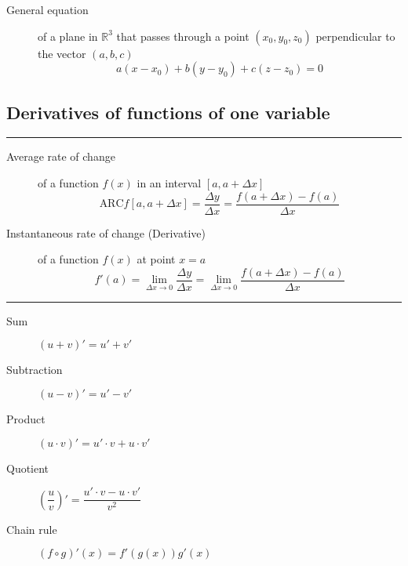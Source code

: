\begin{multicols}{2}
	\begin{tcolorbox}[hbox, title=Planes]
		\begin{minipage}{0.4\textwidth}
			\begin{description}
				\item[General equation] of a plane in $\mathbb{R}^3$ that passes through a point $(x_0,y_0,z_0)$ perpendicular to the vector $(a,b,c)$
				      \[
					      a(x-x_0)+b(y-y_0)+c(z-z_0)=0
				      \]
			\end{description}
		\end{minipage}
	\end{tcolorbox}


\subsection*{Derivatives of functions of one variable}

	\begin{tcolorbox}[hbox, title=Concept of derivative]
		\begin{minipage}{0.4\textwidth}
			\flushleft
			\rule{0.4\textwidth}{0pt}
			\begin{description}
				\item[Average rate of change] of a function $f(x)$ in an interval $[a,a+\Delta x]$
				      \[
					      \mbox{ARC}f[a,a+\Delta x] = \frac{\Delta y}{\Delta x} = \frac{f(a+\Delta x)-f(a)}{\Delta x}
				      \]
				\item[Instantaneous rate of change (Derivative)] of a function $f(x)$ at point $x=a$
				      \[
					      f'(a)=\lim_{\Delta x\rightarrow 0} \frac{\Delta y}{\Delta x} = \lim_{\Delta x\rightarrow 0}\frac{f(a+\Delta x)-f(a)}{\Delta x}
				      \]
			\end{description}
		\end{minipage}
	\end{tcolorbox}

	\begin{tcolorbox}[hbox, title=Algebra of derivatives]
		\begin{minipage}{0.4\textwidth}
			\flushleft
			\rule{0.4\textwidth}{0pt}
			\begin{description}
				\item[Sum] $(u+v)'=u'+v'$
				\item[Subtraction] $(u-v)'=u'-v'$
				\item[Product] $(u\cdot v)'=u'\cdot v+ u\cdot v'$
				\item[Quotient] $\left(\dfrac{u}{v}\right)'=\dfrac{u'\cdot v-u\cdot v'}{v^2}$
				\item[Chain rule] $(f\circ g)'(x)=f'(g(x))g'(x)$
			\end{description}
		\end{minipage}
	\end{tcolorbox}


\end{multicols}
